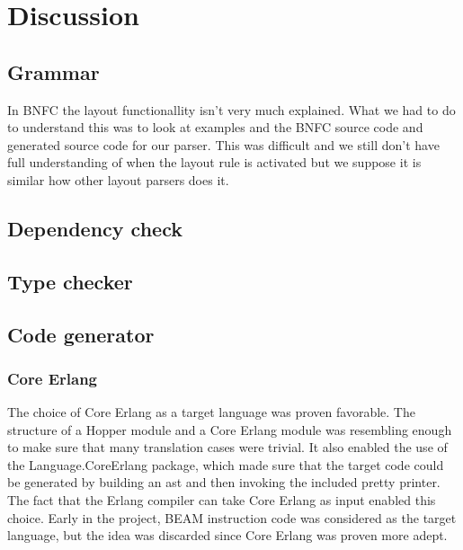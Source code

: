 \chapter{Discussion}



\section{Grammar}


In BNFC the layout functionallity isn't very much explained. What we had to do to understand this was to look at examples and the BNFC source code and generated source code for our parser. This was difficult and we still don't have full understanding of when the layout rule is activated but we suppose it is similar how other layout parsers does it. %

\section{Dependency check}


\section{Type checker}


\section{Code generator}

\subsection{Core Erlang}

The choice of Core Erlang as a target language was proven favorable. The structure of a Hopper module and a Core Erlang module was resembling enough to make sure that many translation cases were trivial. It also enabled the use of the Language.CoreErlang \cite{CoreErlang} package, which made sure that the target code could be generated by building an \gls{ast} and then invoking the included pretty printer. The fact that the Erlang compiler can take Core Erlang as input enabled this choice. Early in the project, BEAM instruction code was considered as the target language, but the idea was discarded since Core Erlang was proven more adept.

